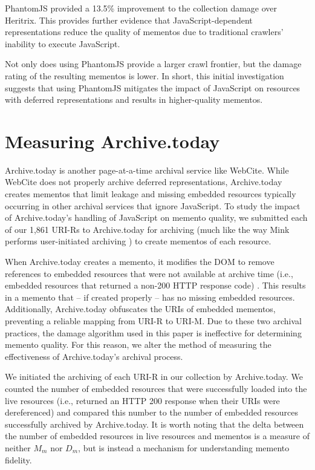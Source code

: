 PhantomJS provided a 13.5\% improvement to the collection damage over Heritrix. This provides further evidence that JavaScript-dependent representations reduce the quality of mementos due to traditional crawlers' inability to execute JavaScript.

Not only does using PhantomJS provide a larger crawl frontier, but the damage rating of the resulting mementos is lower. In short, this initial investigation suggests that using PhantomJS mitigates the impact of JavaScript on resources with deferred representations and results in higher-quality mementos.

\section{Measuring Archive.today}
\label{archivetoday}
Archive.today \cite{archivetoday} is another page-at-a-time archival service like WebCite. While WebCite does not properly archive deferred representations, Archive.today creates mementos that limit leakage and missing embedded resources typically occurring in other archival services that ignore JavaScript. To study the impact of Archive.today's handling of JavaScript on memento quality, we submitted each of our 1,861 URI-Rs to Archive.today for archiving (much like the way Mink performs user-initiated archiving \cite{mink}) to create mementos of each resource. 

When Archive.today creates a memento, it modifies the DOM to remove references to embedded resources that were not available at archive time (i.e., embedded resources that returned a non-200 HTTP response code) \cite{refreshZombies}. This results in a memento that -- if created properly -- has no missing embedded resources. Additionally, Archive.today obfuscates the URIs of embedded mementos, preventing a reliable mapping from URI-R to URI-M. Due to these two archival practices, the damage algorithm used in this paper is ineffective for determining memento quality. For this reason, we alter the method of measuring the effectiveness of Archive.today's archival process. 

We initiated the archiving of each URI-R in our collection by Archive.today. We counted the number of embedded resources that were successfully loaded into the live resources (i.e., returned an HTTP 200 response when their URIs were dereferenced) and compared this number to the number of embedded resources successfully archived by Archive.today. It is worth noting that the delta between the number of embedded resources in live resources and mementos is a measure of neither $M_m$ nor $D_m$, but is instead a mechanism for understanding memento fidelity. 

